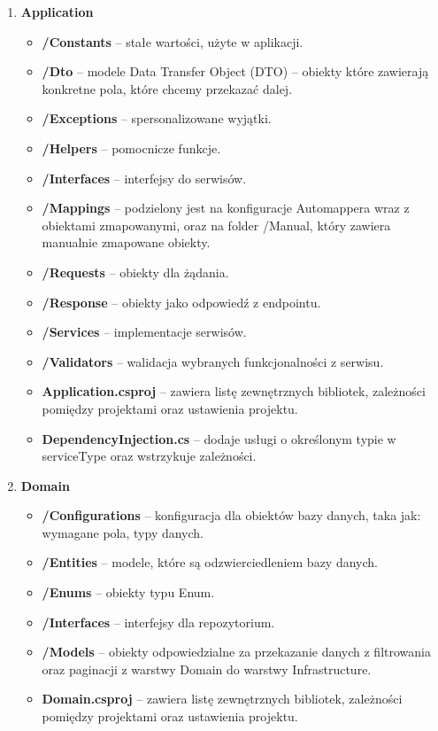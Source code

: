 \documentclass[a4paper,twoside,12pt]{book}
\begin{document}
\begin{enumerate}
    \item \textbf{Application} \begin{itemize}
        \item \textbf{/Constants} -- stałe wartości, użyte w aplikacji.
        \item \textbf{/Dto} -- modele Data Transfer Object (DTO) -- obiekty które zawierają konkretne pola, które chcemy przekazać dalej.
        \item \textbf{/Exceptions} -- spersonalizowane wyjątki.
        \item \textbf{/Helpers} -- pomocnicze funkcje.
        \item \textbf{/Interfaces} -- interfejsy do serwisów.
        \item \textbf{/Mappings} -- podzielony jest na konfiguracje Automappera wraz z obiektami zmapowanymi, oraz na folder /Manual, który zawiera manualnie zmapowane obiekty.
        \item \textbf{/Requests} -- obiekty dla żądania.
        \item \textbf{/Response} -- obiekty jako odpowiedź z endpointu.
        \item \textbf{/Services} -- implementacje serwisów.
        \item \textbf{/Validators} -- walidacja wybranych funkcjonalności z serwisu.
        \item \textbf{Application.csproj} -- zawiera listę zewnętrznych bibliotek, zależności pomiędzy projektami oraz ustawienia projektu.
        \item \textbf{DependencyInjection.cs} -- dodaje usługi o określonym typie w serviceType oraz wstrzykuje zależności.
    \end{itemize}

    \item \textbf{Domain} \begin{itemize}
        \item \textbf{/Configurations } -- konfiguracja dla obiektów bazy danych, taka jak: wymagane pola, typy danych.
        \item \textbf{/Entities} -- modele, które są odzwierciedleniem bazy danych.
        \item \textbf{/Enums} -- obiekty typu Enum.
        \item \textbf{/Interfaces} -- interfejsy dla repozytorium.
        \item \textbf{/Models} -- obiekty odpowiedzialne za przekazanie danych z filtrowania oraz paginacji z warstwy Domain do warstwy Infrastructure.
        \item \textbf{Domain.csproj} -- zawiera listę zewnętrznych bibliotek, zależności pomiędzy projektami oraz ustawienia projektu.
    \end{itemize}


\end{enumerate}
\end{document}

